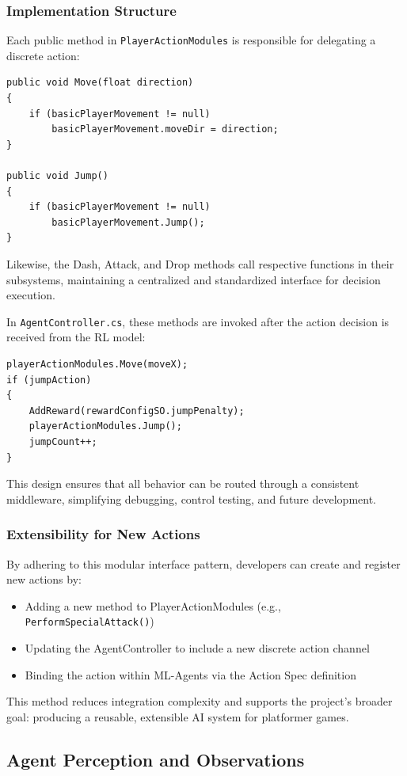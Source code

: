 \documentclass[12pt,oneside,openright,a4paper]{cpe-english-project}
\begin{document}
\subsubsection{Implementation Structure}
Each public method in \texttt{PlayerActionModules} is responsible for delegating a discrete action:
\begin{lstlisting}[language={[Sharp]C}]
public void Move(float direction)
{
	if (basicPlayerMovement != null)
		basicPlayerMovement.moveDir = direction;
}

public void Jump()
{
	if (basicPlayerMovement != null)
		basicPlayerMovement.Jump();
}
\end{lstlisting}
Likewise, the Dash, Attack, and Drop methods call respective functions in their subsystems, maintaining a centralized and standardized interface for decision execution.\par

In \texttt{AgentController.cs}, these methods are invoked after the action decision is received from the RL model:
\begin{lstlisting}[language={[Sharp]C}]
playerActionModules.Move(moveX);
if (jumpAction)
{
	AddReward(rewardConfigSO.jumpPenalty);
	playerActionModules.Jump();
	jumpCount++;
}
\end{lstlisting}
This design ensures that all behavior can be routed through a consistent middleware, simplifying debugging, control testing, and future development.

\subsubsection{Extensibility for New Actions}

By adhering to this modular interface pattern, developers can create and register new actions by:

\begin{itemize}
\item Adding a new method to PlayerActionModules (e.g., \texttt{PerformSpecialAttack()})
\item Updating the AgentController to include a new discrete action channel
\item Binding the action within ML-Agents via the Action Spec definition
\end{itemize}

This method reduces integration complexity and supports the project's broader goal: producing a reusable, extensible AI system for platformer games.

\subsection{Agent Perception and Observations}
\end{document}
